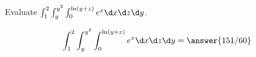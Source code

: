 \documentclass{ximera}
\author{David Guichard \and Neal Koblitz \and H. Jerome Keisler \and Albert Scheller \and Barry Balof \and Mike Wills \and Matthew Carr}
\begin{document}
\begin{exercise}





Evaluate  $\int_{1}^{2}\int_{y}^{y^2}\int_{0}^{\ln(y+z)}e^x \d x\d z\d y$.

\begin{prompt}
\[
\int_{1}^{2}\int_{y}^{y^2}\int_{0}^{\ln(y+z)}e^x \d x\d z\d y=\answer{151/60}
\]
\end{prompt}



\end{exercise}
\end{document}
